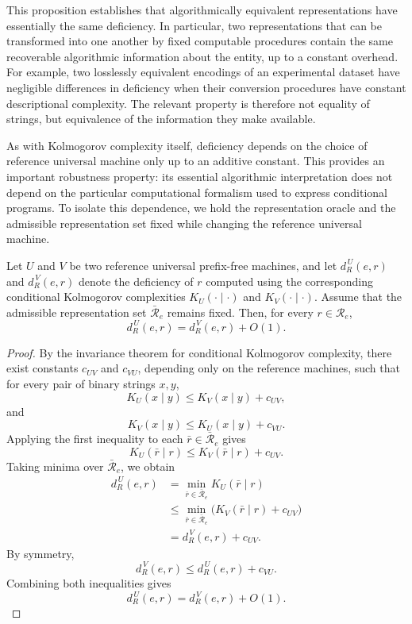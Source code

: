 This proposition establishes that algorithmically equivalent representations have essentially the same deficiency. In particular, two representations that can be transformed into one another by fixed computable procedures contain the same recoverable algorithmic information about the entity, up to a constant overhead. For example, two losslessly equivalent encodings of an experimental dataset have negligible differences in deficiency when their conversion procedures have constant descriptional complexity. The relevant property is therefore not equality of strings, but equivalence of the information they make available.

As with Kolmogorov complexity itself, deficiency depends on the choice of reference universal machine only up to an additive constant. This provides an important robustness property: its essential algorithmic interpretation does not depend on the particular computational formalism used to express conditional programs. To isolate this dependence, we hold the representation oracle and the admissible representation set fixed while changing the reference universal machine.

\begin{proposition}
\label{prop:deficiency_machine_invariance}
Let $U$ and $V$ be two reference universal prefix-free machines, and let $d_R^{\,U}(e,r)$ and $d_R^{\,V}(e,r)$ denote the deficiency of $r$ computed using the corresponding conditional Kolmogorov complexities $K_U(\cdot\mid\cdot)$ and $K_V(\cdot\mid\cdot)$. Assume that the admissible representation set $\bar{\mathcal R}_e$ remains fixed. Then, for every $r\in\mathcal R_e$,
\[
d_R^{\,U}(e,r) = d_R^{\,V}(e,r) + O(1).
\]
\end{proposition}
\begin{proof}
By the invariance theorem for conditional Kolmogorov complexity,
there exist constants $c_{UV}$ and $c_{VU}$, depending only
on the reference machines, such that for every pair of
binary strings $x,y$,
\[
K_U(x\mid y)\le K_V(x\mid y)+c_{UV},
\]
and
\[
K_V(x\mid y)\le K_U(x\mid y)+c_{VU}.
\]
Applying the first inequality to each $\bar r\in\bar{\mathcal R}_e$ gives
\[
K_U(\bar r\mid r) \le K_V(\bar r\mid r) + c_{UV}.
\]
Taking minima over $\bar{\mathcal R}_e$, we obtain
\[
\begin{aligned}
d_R^{\,U}(e,r)
&= \min_{\bar r\in\bar{\mathcal R}_e}K_U(\bar r\mid r)\\
&\le \min_{\bar r\in\bar{\mathcal R}_e} \bigl(K_V(\bar r\mid r)+c_{UV}\bigr)\\
&= d_R^{\,V}(e,r) + c_{UV}.
\end{aligned}
\]
By symmetry,
\[
d_R^{\,V}(e,r)\le d_R^{\,U}(e,r)+c_{VU}.
\]
Combining both inequalities gives
\[
d_R^{\,U}(e,r)=d_R^{\,V}(e,r)+O(1).
\]
\end{proof}

